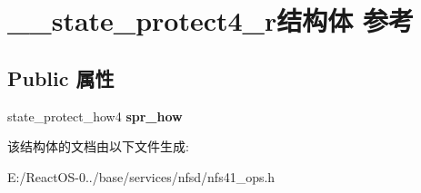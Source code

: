 \hypertarget{struct____state__protect4__r}{}\section{\+\_\+\+\_\+state\+\_\+protect4\+\_\+r结构体 参考}
\label{struct____state__protect4__r}
\subsection*{Public 属性}
\begin{DoxyCompactItemize}
\item 
\mbox{\label{struct____state__protect4__r_a2ceae874f453fd4d8c5763fceaa6a294}} 
state\+\_\+protect\+\_\+how4 {\bfseries spr\+\_\+how}
\end{DoxyCompactItemize}


该结构体的文档由以下文件生成\+:\begin{DoxyCompactItemize}
\item 
E\+:/\+React\+O\+S-\/0../base/services/nfsd/nfs41\+\_\+ops.\+h\end{DoxyCompactItemize}
